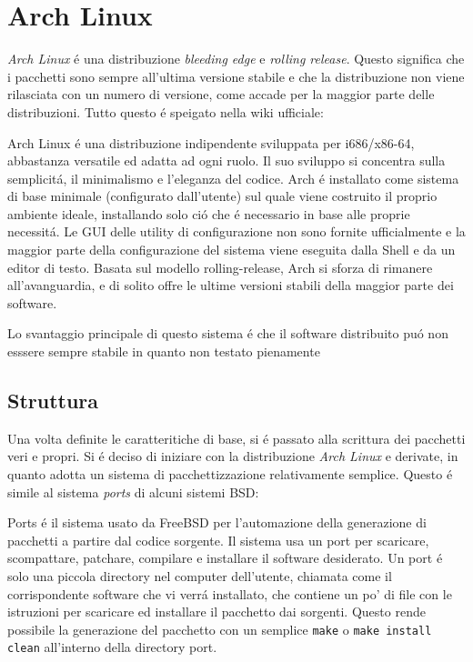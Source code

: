 \documentclass[10pt,titlepage,twoside,a4paper]{report}
\begin{document}
\section{Arch Linux}
\emph{Arch Linux} \'e una distribuzione \emph{bleeding edge} e \emph{rolling 
release}. Questo significa che i pacchetti sono sempre all'ultima versione 
stabile e che la distribuzione non viene rilasciata con un numero di versione, 
come accade per la maggior parte delle distribuzioni. Tutto questo \'e speigato 
nella wiki ufficiale\cite{archLinux}:
\begin{displayquote}
Arch Linux \'e una distribuzione indipendente sviluppata per i686/x86-64, 
abbastanza versatile ed adatta ad ogni ruolo. Il suo sviluppo si concentra 
sulla semplicit\'a, il minimalismo e l'eleganza del codice. Arch \'e installato 
come sistema di base minimale (configurato dall'utente) sul quale viene 
costruito il proprio ambiente ideale, installando solo ci\'o che \'e necessario 
in base alle proprie necessit\'a. Le GUI delle utility di configurazione non 
sono fornite ufficialmente e la maggior parte della configurazione del sistema viene 
eseguita dalla Shell e da un editor di testo. Basata sul modello 
rolling-release, Arch si sforza di rimanere all'avanguardia, e di solito offre 
le ultime versioni stabili della maggior parte dei software.
\end{displayquote}
Lo svantaggio principale di questo sistema \'e che il software distribuito 
pu\'o non esssere sempre stabile in quanto non testato pienamente

\subsection{Struttura}
Una volta definite le caratteritiche di base, si \'e passato alla scrittura dei 
pacchetti veri e propri. Si \'e deciso di iniziare con la 
distribuzione \emph{Arch Linux} e derivate, in quanto adotta un sistema di 
pacchettizzazione relativamente semplice. Questo \'e simile al sistema 
\emph{ports} di alcuni sistemi BSD\cite{portsLikeSystem}:
\begin{displayquote}
Ports \'e il sistema usato da FreeBSD per l'automazione della generazione di 
pacchetti a partire dal codice sorgente. Il sistema usa un port per scaricare, 
scompattare, patchare, compilare e installare il software desiderato. Un port 
\'e solo una piccola directory nel computer dell'utente, chiamata come il 
corrispondente software che vi verr\'a installato, che contiene un po' di file 
con le istruzioni per scaricare ed installare il pacchetto dai sorgenti. Questo 
rende possibile la generazione del pacchetto con un semplice \texttt{make} o 
\texttt{make install clean} all'interno della directory port.
\end{displayquote}
\end{document}
